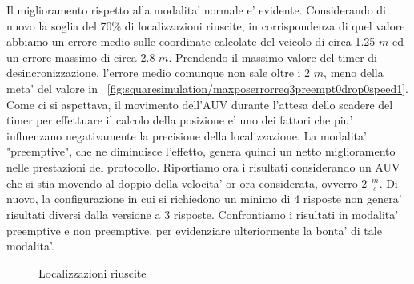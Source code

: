 \documentclass[Lau,binding=0.6cm]{sapthesis}
\begin{document}
Il miglioramento rispetto alla modalita' normale e' evidente. Considerando di nuovo la soglia del 70\% di localizzazioni riuscite, in corrispondenza di quel valore abbiamo un errore medio sulle coordinate calcolate del veicolo di circa 1.25 $m$ ed un errore massimo di circa 2.8 $m$. Prendendo il massimo valore del timer di desincronizzazione, l'errore medio comunque non sale oltre i 2 $m$, meno della meta' del valore in ~\ref{fig:squaresimulation/maxposerrorreq3preempt0drop0speed1}.
Come ci si aspettava, il movimento dell'AUV durante l'attesa dello scadere del timer per effettuare il calcolo della posizione e' uno dei fattori che piu' influenzano negativamente la precisione della localizzazione. La modalita' "preemptive", che ne diminuisce l'effetto, genera quindi un netto miglioramento nelle prestazioni del protocollo.
Riportiamo ora i risultati considerando un AUV che si stia movendo al doppio della velocita' or ora considerata, ovverro 2 $\frac{m}{s}$.
Di nuovo, la configurazione in cui si richiedono un minimo di 4 risposte non genera' risultati diversi dalla versione a 3 risposte.
Confrontiamo i risultati in modalita' preemptive e non preemptive, per evidenziare ulteriormente la bonta' di tale modalita'.

\begin{figure}[H]
    \centering
    \hfill
    \caption{Localizzazioni riuscite}
\end{figure}
\end{document}
